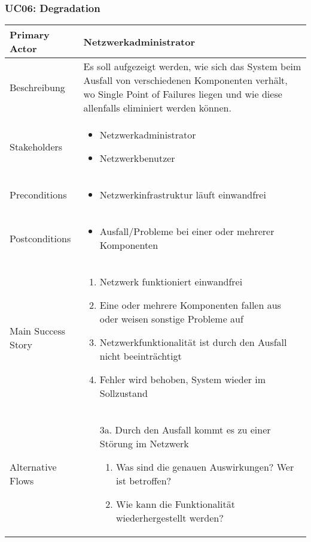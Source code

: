 \subsubsection{UC06: Degradation}
\begin{table}[H]
	\centering
	\begin{tabularx}{\textwidth}{l | X}
		Primary Actor   & Netzwerkadministrator       \\
		\hline
		Beschreibung   & Es soll aufgezeigt werden, wie sich das System beim Ausfall von verschiedenen Komponenten verhält, wo Single Point of Failures liegen und wie diese allenfalls eliminiert werden können.  \\ 
		\hline
		Stakeholders       & 
		\begin{itemize}
			\item Netzwerkadministrator
			\item Netzwerkbenutzer
		\end{itemize} \\ 
		Preconditions      &
		\begin{itemize}	
			\item Netzwerkinfrastruktur läuft einwandfrei
		\end{itemize}  \\
		\hline
		Postconditions     & 
		\begin{itemize}	
			\item Ausfall/Probleme bei einer oder mehrerer Komponenten
		\end{itemize}  \\
		\hline
		Main Success Story & 
		\begin{enumerate}
			\item Netzwerk funktioniert einwandfrei
			\item Eine oder mehrere Komponenten fallen aus oder weisen sonstige Probleme auf
			\item Netzwerkfunktionalität ist durch den Ausfall nicht beeinträchtigt
			\item Fehler wird behoben, System wieder im Sollzustand
		\end{enumerate}
		\\
		\hline
		Alternative Flows  & 
		\begin{itemize}
			\item[3a.]  Durch den Ausfall kommt es zu einer Störung im Netzwerk
			\begin{enumerate}
				\item Was sind die genauen Auswirkungen? Wer ist betroffen?
				\item Wie kann die Funktionalität wiederhergestellt werden?

\end{enumerate}
\end{itemize}
\end{tabularx}
\end{table}
